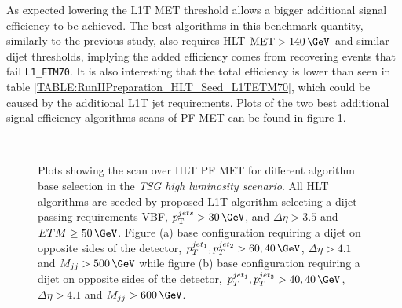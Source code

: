 As expected lowering the \gls{L1T} \gls{MET} threshold allows a bigger additional signal efficiency to be achieved. The best algorithms in this benchmark quantity, similarly to the previous study, also requires \gls{HLT} $\text{MET}>140\,\GeV$  and similar dijet thresholds, implying the added efficiency comes from recovering events that fail \verb|L1_ETM70|. It is also interesting that the total efficiency is lower than seen in table \ref{TABLE:RunIIPreparation_HLT_Seed_L1TETM70}, which could be caused by the additional \gls{L1T} jet requirements. Plots of the two best additional signal efficiency algorithms scans of \gls{PF} \gls{MET} can be found in figure \ref{FIGURE:RunIIPreparation_HLT_Seed_L1TDijetMET}.

\begin{figure}[!htp]%
\qquad
{}\\
\caption{Plots showing the scan over \gls{HLT} \gls{PF} \gls{MET} for different algorithm base selection in the \textit{\gls{TSG} high luminosity scenario}. All \gls{HLT} algorithms are seeded by proposed \gls{L1T} algorithm selecting a dijet passing requirements \gls{VBF}, $\pt^{jets}>30\,\GeV$, and $\Delta\eta>3.5$ and $ETM \geq 50\,\GeV$. Figure (a) base configuration requiring a dijet on opposite sides of the detector, $p_T^{jet_1},p_T^{jet_2}>60,40\,\GeV$, $\Delta\eta>4.1$ and $M_{jj}>500\,\GeV$ while figure (b) base configuration requiring a dijet on opposite sides of the detector, $p_T^{jet_1},p_T^{jet_2}>40,40\,\GeV$, $\Delta\eta>4.1$ and $M_{jj}>600\,\GeV$.}
\label{FIGURE:RunIIPreparation_HLT_Seed_L1TDijetMET}
\end{figure}


